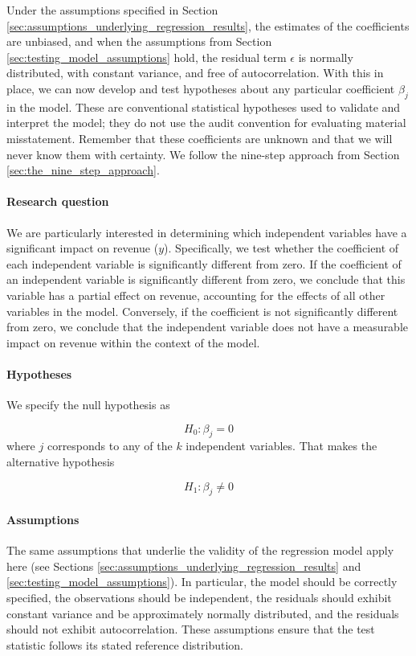 Under the assumptions specified in Section \ref{sec:assumptions_underlying_regression_results}, the estimates of the coefficients are unbiased, and when the assumptions from Section \ref{sec:testing_model_assumptions} hold, the residual term $\epsilon$ is normally distributed, with constant variance, and free of autocorrelation. With this in place, we can now develop and test hypotheses about any particular coefficient $\beta_j$ in the model. These are conventional statistical hypotheses used to validate and interpret the model; they do not use the audit convention for evaluating material misstatement. Remember that these coefficients are unknown and that we will never know them with certainty. We follow the nine-step approach from Section \ref{sec:the_nine_step_approach}.

\paragraph{Research question} We are particularly interested in determining which independent variables have a significant impact on revenue ($y$). Specifically, we test whether the coefficient of each independent variable is significantly different from zero. If the coefficient of an independent variable is significantly different from zero, we conclude that this variable has a partial effect on revenue, accounting for the effects of all other variables in the model. Conversely, if the coefficient is not significantly different from zero, we conclude that the independent variable does not have a measurable impact on revenue within the context of the model.

\paragraph{Hypotheses} We specify the null hypothesis as

\begin{equation*}
H_0 : \beta_j = 0
\end{equation*}
where $j$ corresponds to any of the $k$ independent variables. That makes the alternative hypothesis

\begin{equation*}
H_1 : \beta_j \neq 0
\end{equation*}


\paragraph{Assumptions} The same assumptions that underlie the validity of the regression model apply here (see Sections \ref{sec:assumptions_underlying_regression_results} and \ref{sec:testing_model_assumptions}). 
In particular, the model should be correctly specified, the observations should be independent, the residuals should exhibit constant variance and be approximately normally distributed, and the residuals should not exhibit autocorrelation. 
These assumptions ensure that the test statistic follows its stated reference distribution.


